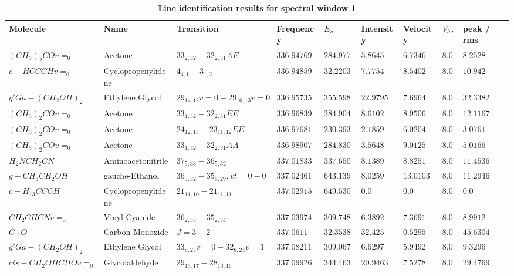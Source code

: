 \documentclass[10pt]{article}
\begin{document}
   \newpage
   \begin{table}[htb]  
    \caption{\textbf{Line identification results for spectral window 1}}
    \small
    \centering    
    \begin{tabular}{l l l l l l l l l} 
\hline
Molecule & Name & Transition & Frequency & $E_{{u}}$ & Intensity & Velocity & $V_{{lsr}}$ & peak / rms \\
\hline
$(CH_{3})_{2}COv=_{0}$ & Acetone & $33_{2,32}-32_{2,31}AE$ & $336.94769$ & $284.9779$ & $5.8645$ & $6.7346$ & $8.0$ & $8.2528$\\
$c-HCCCHv=_{0}$ & Cyclopropenylidene & $4_{4,1}-3_{1,2}$ & $336.94859$ & $32.2203$ & $7.7754$ & $8.5402$ & $8.0$ & $10.942$\\
$g'Ga-(CH_{2}OH)_{2}$ & Ethylene Glycol & $29_{17,12}v=0-29_{16,13}v=0$ & $336.95735$ & $355.5986$ & $22.9795$ & $7.6964$ & $8.0$ & $32.3382$\\
$(CH_{3})_{2}COv=_{0}$ & Acetone & $33_{1,32}-32_{2,31}EE$ & $336.96839$ & $284.9042$ & $8.6102$ & $8.9506$ & $8.0$ & $12.1167$\\
$(CH_{3})_{2}COv=_{0}$ & Acetone & $24_{12,13}-23_{11,12}EE$ & $336.97681$ & $230.3935$ & $2.1859$ & $6.0204$ & $8.0$ & $3.0761$\\
$(CH_{3})_{2}COv=_{0}$ & Acetone & $33_{1,32}-32_{2,31}AA$ & $336.98907$ & $284.8304$ & $3.5648$ & $9.0125$ & $8.0$ & $5.0166$\\
$H_{2}NCH_{2}CN$ & Aminoacetonitrile & $37_{5,33}-36_{5,32}$ & $337.01833$ & $337.6508$ & $8.1389$ & $8.8251$ & $8.0$ & $11.4536$\\
$g-CH_{3}CH_{2}OH$ & gauche-Ethanol & $36_{5,32}-35_{6,29},vt=0-0$ & $337.02461$ & $643.1397$ & $8.0259$ & $13.0103$ & $8.0$ & $11.2946$\\
$c-H_{13}CCCH$ & Cyclopropenylidene & $21_{11,10}-21_{11,11}$ & $337.02915$ & $649.5308$ & $0.0$ & $0.0$ & $8.0$ & $0.0$\\
$CH_{2}CHCNv=_{0}$ & Vinyl Cyanide & $36_{2,35}-35_{2,34}$ & $337.03974$ & $309.7482$ & $6.3892$ & $7.3691$ & $8.0$ & $8.9912$\\
$C_{17}O$ & Carbon Monoxide & $J=3-2$ & $337.0611$ & $32.3538$ & $32.425$ & $0.5295$ & $8.0$ & $45.6304$\\
$g'Ga-(CH_{2}OH)_{2}$ & Ethylene Glycol & $33_{8,25}v=0-32_{8,24}v=1$ & $337.08211$ & $309.0677$ & $6.6297$ & $5.9492$ & $8.0$ & $9.3296$\\
$cis-CH_{2}OHCHOv=_{0}$ & Glycolaldehyde & $29_{13,17}-28_{13,16}$ & $337.09926$ & $344.463$ & $20.9463$ & $7.5278$ & $8.0$ & $29.4769$\\

\end{tabular}
\end{table}
\end{document}
